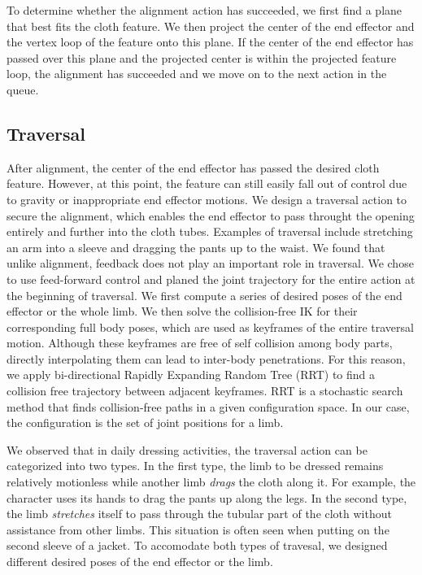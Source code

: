 To determine whether the alignment action has succeeded, we first find a plane that best fits the cloth feature. We then project the center of the end effector and the vertex loop of the feature onto this plane. If the center of the end effector has passed over this plane and the projected center is within the projected feature loop, the alignment has succeeded and we move on to the next action in the queue.

\subsection{Traversal}
After alignment, the center of the end effector has passed the desired cloth feature. However, at this point, the feature can still easily fall out of control due to gravity or inappropriate end effector motions. We design a traversal action to secure the alignment, which enables the end effector to pass throught the opening entirely and further into the cloth tubes. Examples of traversal include stretching an arm into a sleeve and dragging the pants up to the waist. We found that unlike alignment, feedback does not play an important role in traversal. We chose to use feed-forward control and planed the joint trajectory for the entire action at the beginning of traversal. We first compute a series of desired poses of the end effector or the whole limb. We then solve the collision-free IK for their corresponding full body poses, which are used as keyframes of the entire traversal motion. Although these keyframes are free of self collision among body parts, directly interpolating them can lead to inter-body penetrations. For this reason, we apply bi-directional Rapidly Expanding Random Tree (RRT) \cite{} to find a collision free trajectory between adjacent keyframes. RRT is a stochastic search method that finds collision-free paths in a given configuration space. In our case, the configuration is the set of joint positions for a limb.

We observed that in daily dressing activities, the traversal action can be categorized into two types. In the first type, the limb to be dressed remains relatively motionless while another limb \emph{drags} the cloth along it. For example, the character uses its hands to drag the pants up along the legs. In the second type, the limb \emph{stretches} itself to pass through the tubular part of the cloth without assistance from other limbs. This situation is often seen when putting on the second sleeve of a jacket. To accomodate both types of travesal, we designed different desired poses of the end effector or the limb.

